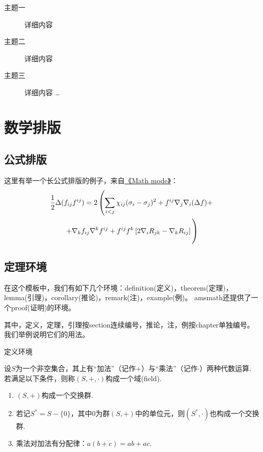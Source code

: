 \begin{description}
	\item[主题一] 详细内容
	\item[主题二] 详细内容
	\item[主题三] 详细内容 \ldots
\end{description}

\section{数学排版}

\subsection{公式排版}

这里有举一个长公式排版的例子，来自\href{http://www.tex.ac.uk/tex-archive/info/math/voss/mathmode/Mathmode.pdf}{《Math mode》}：
\begin{multline}
\frac {1}{2}\Delta (f_{ij}f^{ij})=
2\left (\sum _{i<j}\chi _{ij}(\sigma _{i}-
\sigma _{j}) ^{2}+ f^{ij}\nabla _{j}\nabla _{i}(\Delta f)+\right .\\
\left .+\nabla _{k}f_{ij}\nabla ^{k}f^{ij}+
f^{ij}f^{k}\left [2\nabla _{i}R_{jk}-
\nabla _{k}R_{ij}\right ]\vphantom {\sum _{i<j}}\right )
\end{multline}

\subsection{定理环境}

在这个模板中，我们有如下几个环境：definition(定义)，theorem(定理)，lemma(引理)，corollary(推论)，remark(注)，example(例)。
amsmath还提供了一个proof(证明)的环境。

其中，定义，定理，引理按section连续编号，推论，注，例按chapter单独编号。
我们举例说明它们的用法。

定义环境
\begin{definition}[域]\label{def:field}
	设$S$为一个非空集合，其上有“加法”（记作$+$）与“乘法”（记作$\cdot$）两种代数运算. 若满足以下条件，则称$(S,+,\cdot)$构成一个域(field).
	\begin{enumerate}[label={\rm{\roman*)}}]
		\item $(S,+)$构成一个交换群.
		\item 若记$S^{*}=S-\{0\}$，其中$0$为群$(S,+)$中的单位元，则$(S^{*},\cdot)$也构成一个交换群.
		\item 乘法对加法有分配律：$a ( b + c ) = a b + a c$.
	\end{enumerate}
\end{definition}

